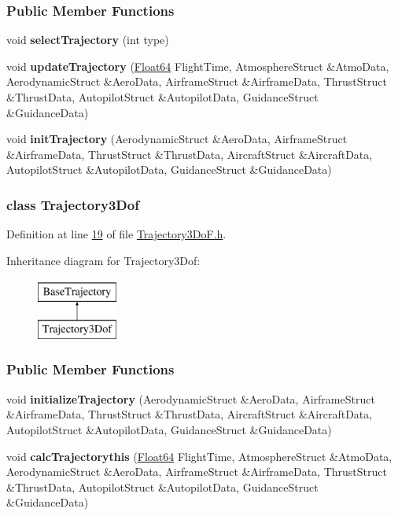 \subsubsection*{Public Member Functions}
\begin{DoxyCompactItemize}
\item 
void {\bfseries select\+Trajectory} (int type)
\item 
void {\bfseries update\+Trajectory} (\hyperlink{group___tools_ga3f1431cb9f76da10f59246d1d743dc2c}{Float64} Flight\+Time, Atmosphere\+Struct \&Atmo\+Data, Aerodynamic\+Struct \&Aero\+Data, Airframe\+Struct \&Airframe\+Data, Thrust\+Struct \&Thrust\+Data, Autopilot\+Struct \&Autopilot\+Data, Guidance\+Struct \&Guidance\+Data)
\item 
void {\bfseries init\+Trajectory} (Aerodynamic\+Struct \&Aero\+Data, Airframe\+Struct \&Airframe\+Data, Thrust\+Struct \&Thrust\+Data, Aircraft\+Struct \&Aircraft\+Data, Autopilot\+Struct \&Autopilot\+Data, Guidance\+Struct \&Guidance\+Data)
\end{DoxyCompactItemize}
\label{class_trajectory3_dof}
\subsubsection{class Trajectory3\+Dof}


Definition at line \hyperlink{_trajectory3_do_f_8h_source_l00019}{19} of file \hyperlink{_trajectory3_do_f_8h_source}{Trajectory3\+Do\+F.\+h}.

Inheritance diagram for Trajectory3\+Dof\+:\begin{figure}[H]
\begin{center}
\leavevmode
\includegraphics[height=2.000000cm]{group___trajectory}
\end{center}
\end{figure}
\subsubsection*{Public Member Functions}
\begin{DoxyCompactItemize}
\item 
void {\bfseries initialize\+Trajectory} (Aerodynamic\+Struct \&Aero\+Data, Airframe\+Struct \&Airframe\+Data, Thrust\+Struct \&Thrust\+Data, Aircraft\+Struct \&Aircraft\+Data, Autopilot\+Struct \&Autopilot\+Data, Guidance\+Struct \&Guidance\+Data)
\item 
void {\bfseries calc\+Trajectorythis} (\hyperlink{group___tools_ga3f1431cb9f76da10f59246d1d743dc2c}{Float64} Flight\+Time, Atmosphere\+Struct \&Atmo\+Data, Aerodynamic\+Struct \&Aero\+Data, Airframe\+Struct \&Airframe\+Data, Thrust\+Struct \&Thrust\+Data, Autopilot\+Struct \&Autopilot\+Data, Guidance\+Struct \&Guidance\+Data)
\end{DoxyCompactItemize}
